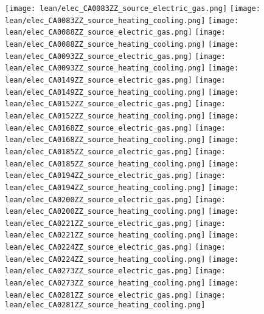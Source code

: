 \texttt{[image: lean/elec\_CA0083ZZ\_source\_electric\_gas.png]}
\texttt{[image: lean/elec\_CA0083ZZ\_source\_heating\_cooling.png]}
\texttt{[image: lean/elec\_CA0088ZZ\_source\_electric\_gas.png]}
\texttt{[image: lean/elec\_CA0088ZZ\_source\_heating\_cooling.png]}
\texttt{[image: lean/elec\_CA0093ZZ\_source\_electric\_gas.png]}
\texttt{[image: lean/elec\_CA0093ZZ\_source\_heating\_cooling.png]}
\texttt{[image: lean/elec\_CA0149ZZ\_source\_electric\_gas.png]}
\texttt{[image: lean/elec\_CA0149ZZ\_source\_heating\_cooling.png]}
\texttt{[image: lean/elec\_CA0152ZZ\_source\_electric\_gas.png]}
\texttt{[image: lean/elec\_CA0152ZZ\_source\_heating\_cooling.png]}
\texttt{[image: lean/elec\_CA0168ZZ\_source\_electric\_gas.png]}
\texttt{[image: lean/elec\_CA0168ZZ\_source\_heating\_cooling.png]}
\texttt{[image: lean/elec\_CA0185ZZ\_source\_electric\_gas.png]}
\texttt{[image: lean/elec\_CA0185ZZ\_source\_heating\_cooling.png]}
\texttt{[image: lean/elec\_CA0194ZZ\_source\_electric\_gas.png]}
\texttt{[image: lean/elec\_CA0194ZZ\_source\_heating\_cooling.png]}
\texttt{[image: lean/elec\_CA0200ZZ\_source\_electric\_gas.png]}
\texttt{[image: lean/elec\_CA0200ZZ\_source\_heating\_cooling.png]}
\texttt{[image: lean/elec\_CA0221ZZ\_source\_electric\_gas.png]}
\texttt{[image: lean/elec\_CA0221ZZ\_source\_heating\_cooling.png]}
\texttt{[image: lean/elec\_CA0224ZZ\_source\_electric\_gas.png]}
\texttt{[image: lean/elec\_CA0224ZZ\_source\_heating\_cooling.png]}
\texttt{[image: lean/elec\_CA0273ZZ\_source\_electric\_gas.png]}
\texttt{[image: lean/elec\_CA0273ZZ\_source\_heating\_cooling.png]}
\texttt{[image: lean/elec\_CA0281ZZ\_source\_electric\_gas.png]}
\texttt{[image: lean/elec\_CA0281ZZ\_source\_heating\_cooling.png]}
